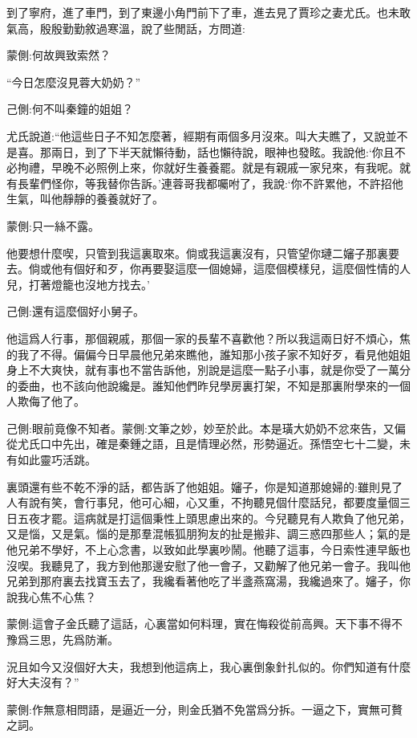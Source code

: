 \begin{parag}
    到了寧府，進了車門，到了東邊小角門前下了車，進去見了賈珍之妻尤氏。也未敢氣高，殷殷勤勤敘過寒溫，說了些閒話，方問道:\begin{note}蒙側:何故興致索然？\end{note}“今日怎麼沒見蓉大奶奶？”\begin{note}己側:何不叫秦鐘的姐姐？\end{note}尤氏說道:“他這些日子不知怎麼著，經期有兩個多月沒來。叫大夫瞧了，又說並不是喜。那兩日，到了下半天就懶待動，話也懶待說，眼神也發眩。我說他:‘你且不必拘禮，早晚不必照例上來，你就好生養養罷。就是有親戚一家兒來，有我呢。就有長輩們怪你，等我替你告訴。’連蓉哥我都囑咐了，我說:‘你不許累他，不許招他生氣，叫他靜靜的養養就好了。\begin{note}蒙側:只一絲不露。\end{note}他要想什麼喫，只管到我這裏取來。倘或我這裏沒有，只管望你璉二嬸子那裏要去。倘或他有個好和歹，你再要娶這麼一個媳婦，這麼個模樣兒，這麼個性情的人兒，打著燈籠也沒地方找去。’\begin{note}己側:還有這麼個好小舅子。\end{note}他這爲人行事，那個親戚，那個一家的長輩不喜歡他？所以我這兩日好不煩心，焦的我了不得。偏偏今日早晨他兄弟來瞧他，誰知那小孩子家不知好歹，看見他姐姐身上不大爽快，就有事也不當告訴他，別說是這麼一點子小事，就是你受了一萬分的委曲，也不該向他說纔是。誰知他們昨兒學房裏打架，不知是那裏附學來的一個人欺侮了他了。\begin{note}己側:眼前竟像不知者。蒙側:文筆之妙，妙至於此。本是璜大奶奶不忿來告，又偏從尤氏口中先出，確是秦鍾之語，且是情理必然，形勢逼近。孫悟空七十二變，未有如此靈巧活跳。\end{note}裏頭還有些不乾不淨的話，都告訴了他姐姐。嬸子，你是知道那媳婦的:雖則見了人有說有笑，會行事兒，他可心細，心又重，不拘聽見個什麼話兒，都要度量個三日五夜才罷。這病就是打這個秉性上頭思慮出來的。今兒聽見有人欺負了他兄弟，又是惱，又是氣。惱的是那羣混帳狐朋狗友的扯是搬非、調三惑四那些人；氣的是他兄弟不學好，不上心念書，以致如此學裏吵鬧。他聽了這事，今日索性連早飯也沒喫。我聽見了，我方到他那邊安慰了他一會子，又勸解了他兄弟一會子。我叫他兄弟到那府裏去找寶玉去了，我纔看著他吃了半盞燕窩湯，我纔過來了。嬸子，你說我心焦不心焦？\begin{note}蒙側:這會子金氏聽了這話，心裏當如何料理，實在悔殺從前高興。天下事不得不豫爲三思，先爲防漸。\end{note}況且如今又沒個好大夫，我想到他這病上，我心裏倒象針扎似的。你們知道有什麼好大夫沒有？”\begin{note}蒙側:作無意相問語，是逼近一分，則金氏猶不免當爲分拆。一逼之下，實無可贅之詞。\end{note}
\end{parag}


